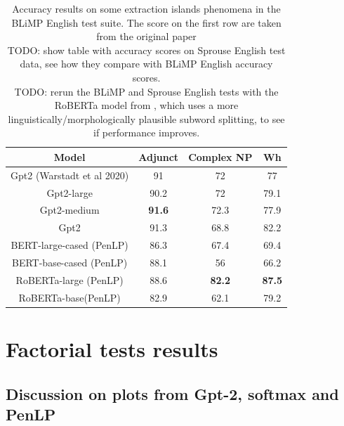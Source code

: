 \begin{table} 
	\begin{center}
		\begin{tabular}{c|c|c|c} 
			Model & \textbf{Adjunct} & \textbf{Complex NP} & \textbf{Wh} \\
			\hline
			Gpt2 (Warstadt et al 2020) 	& 91 			& 72 			& 77 \\ 
			Gpt2-large 					& 90.2 			& 72 			& 79.1 \\ 
	  		Gpt2-medium 				& \textbf{91.6} & 72.3			& 77.9 \\
	  		Gpt2 						& 91.3 			& 68.8 			& 82.2 \\
	  		BERT-large-cased (PenLP)	& 86.3			& 67.4 			& 69.4 \\
	  		BERT-base-cased (PenLP)		& 88.1 			& 56 			& 66.2 \\
	  		RoBERTa-large (PenLP)		& 88.6			& \textbf{82.2}	& \textbf{87.5} \\
	  		RoBERTa-base(PenLP)			& 82.9			& 62.1 			& 79.2 \\   
	  		 
		\end{tabular}
		\caption{Accuracy results on some extraction islands phenomena in the BLiMP English test suite. The score on the first row are taken from the original paper \citet{warstadt2020blimp} 
			\\ TODO: show table with accuracy scores on Sprouse English test data, see how they compare with BLiMP English accuracy scores.
			\\ TODO: rerun the BLiMP and Sprouse English tests with the RoBERTa model from \citet{bostrom2020byte}, which uses a more linguistically/morphologically plausible subword splitting, to see if performance improves.}
		\label{tab:accuracy_blimp}
	\end{center}
\end{table}


\section{Factorial tests results}



\subsection{Discussion on plots from Gpt-2, softmax and PenLP}

